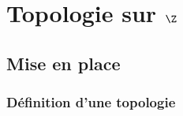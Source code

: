 \documentclass{livre}
\begin{document}
\tableofcontents
\printbibliography

\mainmatter

\part{Topologie sur $\Z$}
\chapter{Mise en place}

\section{Définition d'une topologie}
\end{document}
